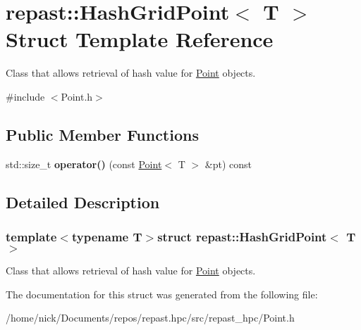 \hypertarget{structrepast_1_1_hash_grid_point}{\section{repast\-:\-:Hash\-Grid\-Point$<$ T $>$ Struct Template Reference}
\label{structrepast_1_1_hash_grid_point}
}


Class that allows retrieval of hash value for \hyperlink{classrepast_1_1_point}{Point} objects.  




{\ttfamily \#include $<$Point.\-h$>$}

\subsection*{Public Member Functions}
\begin{DoxyCompactItemize}
\item 
\hypertarget{structrepast_1_1_hash_grid_point_a9fad86917c52a2719abe4ef8ca0167fa}{std\-::size\-\_\-t {\bfseries operator()} (const \hyperlink{classrepast_1_1_point}{Point}$<$ T $>$ \&pt) const }\label{structrepast_1_1_hash_grid_point_a9fad86917c52a2719abe4ef8ca0167fa}

\end{DoxyCompactItemize}


\subsection{Detailed Description}
\subsubsection*{template$<$typename T$>$struct repast\-::\-Hash\-Grid\-Point$<$ T $>$}

Class that allows retrieval of hash value for \hyperlink{classrepast_1_1_point}{Point} objects. 

The documentation for this struct was generated from the following file\-:\begin{DoxyCompactItemize}
\item 
/home/nick/\-Documents/repos/repast.\-hpc/src/repast\-\_\-hpc/Point.\-h\end{DoxyCompactItemize}
